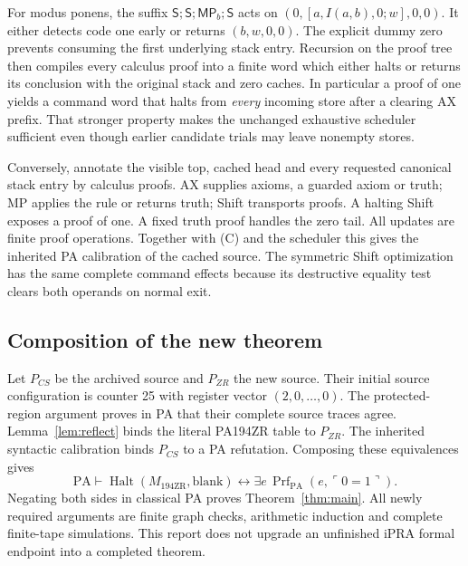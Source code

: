 \documentclass[11pt,letterpaper]{article}
\newcommand{\PA}{\mathrm{PA}}
\newcommand{\Halt}{\operatorname{Halt}}
\newcommand{\Prf}{\operatorname{Prf}}
\newcommand{\M}{M_{\mathrm{194ZR}}}
\begin{document}
For modus ponens, the suffix
$\mathsf S;\mathsf S;\mathsf{MP}_b;\mathsf S$ acts on
$(0,[a,I(a,b),0;w],0,0)$. It either detects code one early or returns
$(b,w,0,0)$. The explicit dummy zero prevents consuming the first
underlying stack entry. Recursion on the proof tree then compiles every
calculus proof into a finite word which either halts or returns its
conclusion with the original stack and zero caches. In particular a proof
of one yields a command word that halts from \emph{every} incoming store
after a clearing AX prefix. That stronger property makes the unchanged
exhaustive scheduler sufficient even though earlier candidate trials may
leave nonempty stores.

Conversely, annotate the visible top, cached head and every requested
canonical stack entry by calculus proofs. AX supplies axioms, a guarded
axiom or truth; MP applies the rule or returns truth; Shift transports
proofs. A halting Shift exposes a proof of one. A fixed truth proof
handles the zero tail. All updates are finite proof operations. Together
with (C) and the scheduler this gives the inherited PA calibration of the
cached source. The symmetric Shift optimization has the same complete
command effects because its destructive equality test clears both
operands on normal exit.

\subsection{Composition of the new theorem}
Let $P_{CS}$ be the archived source and $P_{ZR}$ the new source. Their
initial source configuration is counter 25 with register vector
$(2,0,\ldots,0)$. The protected-region argument proves in PA that their
complete source traces agree. Lemma~\ref{lem:reflect} binds the literal
PA194ZR table to $P_{ZR}$. The inherited syntactic calibration binds
$P_{CS}$ to a PA refutation. Composing these equivalences gives
\[
 \PA\vdash
 \Halt(\M,\mathrm{blank})\leftrightarrow
      \exists e\,\Prf_{\PA}(e,\ulcorner0=1\urcorner).
\]
Negating both sides in classical PA proves Theorem~\ref{thm:main}.
All newly required arguments are finite graph checks, arithmetic
induction and complete finite-tape simulations. This report does not
upgrade an unfinished iPRA formal endpoint into a completed theorem.


\end{document}
